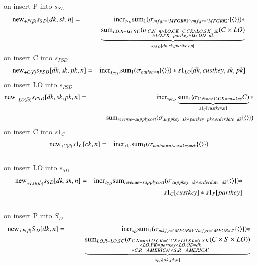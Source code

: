 on insert P into $s_{SD}$
\begin{eqnarray}
\mathrm{new}_{+P (\vec{p})} s_{SD} [dk, sk, n] &=& \mathrm{incr}_{s_{SD}}
\mathrm{sum}_{1} (\sigma_{mfgr = `MFGR\#1' \vee mfgr = `MFGR\#2'} \{{\langle\rangle}\}) *
\\\nonumber&& \qquad
\underbrace{ \mathrm{sum}_{LO.R - LO.SC} (\sigma_{\substack{C.N = n \wedge LO.CK = C.CK \wedge LO.SK = sk \\\wedge LO.PK = partkey \wedge LO.OD = dk }} (C \times LO)}_{s_{PSD}[dk, sk, partkey, n]}
\end{eqnarray}
on insert C into $s_{PSD}$
\begin{eqnarray}
\mathrm{new}_{+ C(\vec{c })} s_{PSD} [dk, sk, pk, n ] &=& \mathrm{incr}_{s_{PSD}}
\mathrm{sum}_{1} (\sigma_{nation = n } \{{\langle\rangle}\}) * s1_{LO}[dk, custkey, sk, pk]
\end{eqnarray}
on insert LO into $s_{PSD}$
\begin{eqnarray}
\mathrm{new}_{+LO (\vec{lo})} s_{PSD} [dk, sk, pk, n] &=& \mathrm{incr}_{s_{PSD}}
\underbrace{\mathrm{sum}_{1} (\sigma_{C.N = n \wedge C.CK = custkey} C)}_{s1_{C}[custkey, n]} *
\\\nonumber&& \qquad
\mathrm{sum}_{revenue-supplycost} (\sigma_{suppkey = sk \wedge partkey = pk \wedge orderdate = dk} \{{\langle\rangle}\})
\end{eqnarray}
on insert C into $s1_{C}$
\begin{eqnarray}
\mathrm{new}_{+C (\vec{c})} s1_{C} [ck, n] &=& \mathrm{incr}_{s1_{C}}
\mathrm{sum}_{1} (\sigma_{nation = n \wedge custkey = ck} \{{\langle\rangle}\})
\end{eqnarray}
\\
on insert LO into $s_{SD}$
\begin{eqnarray}
\mathrm{new}_{+LO (\vec{lo})} s_{SD} [dk, sk, n] &=& \mathrm{incr}_{s_{SD}}
\mathrm{sum}_{revenue-supplycost} (\sigma_{suppkey = sk \wedge orderdate = dk} \{{\langle\rangle}\} ) * 
\\\nonumber&& \qquad
s1_{C}[custkey] * s1_{P} [partkey]
\end{eqnarray}
\\
on insert P into $S_{D}$
\begin{eqnarray}
\mathrm{new}_{+P(\vec{p})} S_{D} [dk, n] &=& \mathrm{incr}_{s_{D}}
\mathrm{sum}_{1} (\sigma_{mkfg = `MFGR\#1' \vee mfgr = `MFGR\#2' } \{{\langle\rangle}\}) *   
\\\nonumber&& \qquad 
\underbrace{ \mathrm{sum}_{LO.R - LO.SC}( \sigma_{\substack{ C.N = n \wedge LO.CK = C.CK \wedge LO.SK = S.SK \\\wedge LO.PK = partkey \wedge LO.OD = dk \\\wedge C.R = `AMERICA' \wedge  S.R = `AMERICA' }} ( C \times S \times LO ))}_{s_{PD}[dk, pk, n]}\\
\end{eqnarray}
